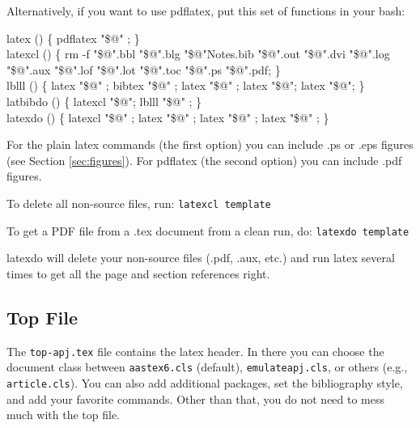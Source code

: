 Alternatively, if you want to use pdflatex, put this set of functions
in your bash:

\footnotesize
latex () \{ pdflatex "\$@" ; \}\\
latexcl () \{ rm -f "\$@".bbl "\$@".blg "\$@"Notes.bib "\$@".out "\$@".dvi "\$@".log "\$@".aux "\$@".lof "\$@".lot "\$@".toc "\$@".ps "\$@".pdf; \} \\
lblll () \{ latex "\$@" ; bibtex "\$@" ; latex "\$@" ; latex "\$@"; latex "\$@"; \}\\
latbibdo () \{ latexcl "\$@"; lblll "\$@" ; \}\\
latexdo () \{ latexcl "\$@" ; latex "\$@" ; latex "\$@" ; latex "\$@" ; \}\\
\normalsize

For the plain latex commands (the first option) you can include .ps or .eps figures (see Section \ref{sec:figures}). For pdflatex (the second option) you can include .pdf figures.

To delete all non-source files, run: \newline
\indent \texttt{latexcl template} \newline

To get a PDF file from a .tex document from a clean run, do: \newline
\indent \texttt{latexdo template} \newline

latexdo will delete your non-source files (.pdf, .aux, etc.) and run latex
several times to get all the page and section references right.


\subsection{Top File}

The \texttt{top-apj.tex} file contains the latex header.  In there you
can choose the document class between \texttt{aastex6.cls} (default),
\texttt{emulateapj.cls}, or others (e.g., \texttt{article.cls}).  You
can also add additional packages, set the bibliography style, and add
your favorite commands.  Other than that, you do not need to mess much
with the top file.


